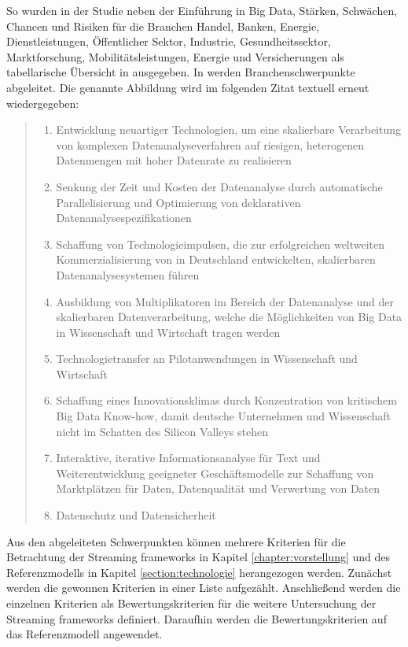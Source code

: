 So wurden in der Studie  neben der Einführung in Big Data, Stärken, Schwächen, Chancen und Risiken für die Branchen Handel, Banken, Energie, Dienstleistungen, Öffentlicher Sektor, Industrie, Gesundheitssektor, Marktforschung, Mobilitätsleistungen, Energie und Versicherungen als tabellarische Übersicht in  ausgegeben. In  werden Branchenschwerpunkte abgeleitet. Die genannte Abbildung wird im folgenden Zitat textuell erneut wiedergegeben:

\begin{quote}
	\begin{enumerate}
		\item Entwicklung neuartiger Technologien, um eine skalierbare Verarbeitung von komplexen Datenanalyseverfahren auf riesigen, heterogenen Datenmengen mit hoher Datenrate zu realisieren
		\item Senkung der Zeit und Kosten der Datenanalyse durch automatische Parallelisierung und Optimierung von deklarativen Datenanalysespezifikationen
		\item Schaffung von Technologieimpulsen, die zur erfolgreichen weltweiten Kommerzialisierung von in Deutschland entwickelten, skalierbaren Datenanalysesystemen führen
		\item Ausbildung von Multiplikatoren im Bereich der Datenanalyse und der skalierbaren Datenverarbeitung, welche die Möglichkeiten von Big Data in Wissenschaft und Wirtschaft tragen werden
		\item Technologietransfer an Pilotanwendungen in Wissenschaft und Wirtschaft
		\item Schaffung eines Innovationsklimas durch Konzentration von kritischem Big Data Know-how, damit deutsche Unternehmen und Wissenschaft nicht im Schatten des Silicon Valleys stehen
		\item Interaktive, iterative Informationsanalyse für Text und Weiterentwicklung geeigneter Geschäftsmodelle zur Schaffung von Marktplätzen für Daten, Datenqualität und Verwertung von Daten
		\item Datenschutz und Datensicherheit
	\end{enumerate}
\end{quote}

Aus den abgeleiteten Schwerpunkten können mehrere Kriterien für die Betrachtung der Streaming frameworks in Kapitel \ref{chapter:vorstellung} und des Referenzmodells in Kapitel \ref{section:technologie} herangezogen werden. Zunächst werden die gewonnen Kriterien in einer Liste aufgezählt. Anschließend werden die einzelnen Kriterien als Bewertungskriterien für die weitere Untersuchung der Streaming frameworks definiert. Daraufhin werden die Bewertungskriterien auf das Referenzmodell angewendet.

